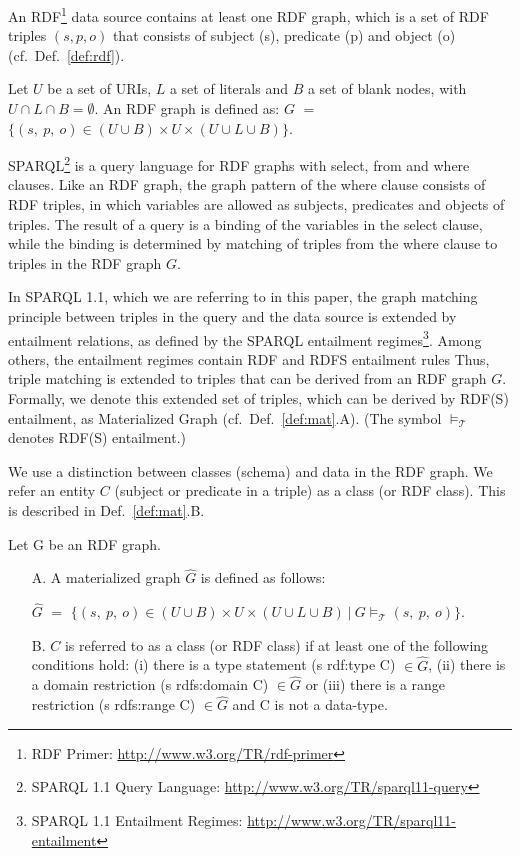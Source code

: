 \documentclass{llncs} %
\begin{document}
An RDF\footnote{RDF Primer: \url{http://www.w3.org/TR/rdf-primer}} data source contains at least one RDF graph, which is a set of RDF triples $(s, p, o)$
that consists of subject (s), predicate (p)  and object (o) (cf.~Def.~\ref{def:rdf}).

\begin{definition}
\label{def:rdf}
Let $U$ be a set of URIs, $L$  a set of literals and $B$ a set of blank nodes,
with $U \cap L \cap B = \emptyset$.
An RDF graph is defined as:
$G$ $=$ $\{ (s ,\ p , \ o) \in (U\cup B)\times U \times (U\cup L \cup B) \} $. 
\end{definition}


SPARQL\footnote{SPARQL 1.1 Query Language: \url{http://www.w3.org/TR/sparql11-query}} 
is a query language for RDF graphs with  \textsf{select}, \textsf{from} and \textsf{where} clauses.
Like an RDF graph, the graph pattern of the \textsf{where} clause consists of RDF triples, in which
variables are allowed as subjects, predicates and objects of triples.
The result of a query is a binding of the variables in the \textsf{select} clause,
while the binding is determined by matching of triples from the \textsf{where} clause
to triples in the RDF graph $G$.

In SPARQL 1.1, which we are referring to in this paper, the graph matching principle between triples in the query and the data source
is extended by entailment relations, as defined by the SPARQL entailment regimes\footnote{SPARQL 1.1 Entailment Regimes:
\url{http://www.w3.org/TR/sparql11-entailment}}. Among others, the entailment regimes contain RDF and RDFS entailment rules
Thus, triple matching is extended to triples that can be derived from an RDF graph $G$. Formally, we denote
this extended set of triples, which can be derived by RDF(S) entailment, as Materialized Graph (cf.~Def.~\ref{def:mat}.A).
(The symbol $\models_{\mathcal{T}}$ denotes RDF(S) entailment.)

We use a distinction between classes (schema) and data in the RDF graph.
We refer an entity $C$ (subject or predicate in a triple) as a class (or RDF class).
This is described in Def.~\ref{def:mat}.B.
 

\begin{definition}
\label{def:mat}
Let $\mathrm{G}$ be an RDF graph.
\begin{itemize}
	\item[A.]  A materialized graph $\hat{G}$ is defined as follows:

$\hat{G}$ $=$ $\{ (s ,\ p , \ o) \in (U\cup B)\times U \times (U\cup L \cup B) \ | \ G \models_{\mathcal{T}} (s, \ p, \ o) \}  $. 

\item[B.] $C$ is referred to as a class (or RDF class) if at least one of the following conditions hold:
(i) there is a type statement  (s rdf:type C) $\in \hat{G}$,
 (ii) there is a domain restriction (s rdfs:domain C) $\in \hat{G}$ or 
(iii) there is a range restriction (s rdfs:range C) $\in \hat{G}$ and C is not a data-type.
\end{itemize}
\end{definition}
\end{document}
